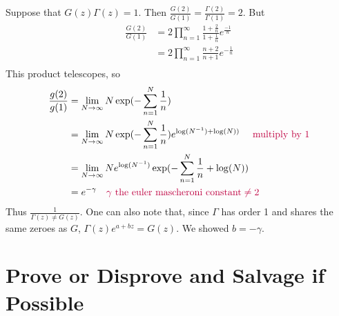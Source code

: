 \documentclass{homework}
\begin{document}
                                    \begin{solution}
                                    Suppose that $G(z)\Gamma(z) = 1$. Then $\frac{G(2)}{G(1)} = \frac{\Gamma(2)}{\Gamma(1)} = 2$. But
                                    \begin{align*}
                                    \frac{G(2)}{G(1)} &= 2\prod_{n=1}^\infty\frac{1+\frac{2}{n}}{1 + \frac{1}{n}}e^{\frac{-1}{n}}\\
                                    &= 2\prod_{n=1}^\infty \frac{n + 2}{n + 1}e^{-\frac{1}{n}}\\
                                    \end{align*}
                                    This product telescopes, so
                                    \begin{align*}
                                    \frac{g(2)}{g(1)} &= \lim_{N\to\infty} N\exp({-\sum_{n=1}^N \frac{1}{n}})\\
                                    &= \lim_{N\to\infty} N\exp({-\sum_{n=1}^N \frac{1}{n}})e^{\log(N^{-1}) + \log(N))}\quad\color{purple} \text{ multiply by 1}\\
                                    &= \lim_{N\to\infty} Ne^{\log(N^{-1})}\exp({-\sum_{n=1}^N \frac{1}{n} + \log(N)})\\
                                    &= e^{-\gamma} \quad\color{purple} \gamma \text{ the euler mascheroni constant} \neq 2
                                    \end{align*}
                                    Thus $\frac{1}{\Gamma(z)\neq G(z)}$. One can also note that, since $\Gamma$ has order 1 and shares the same zeroes as $G$, $\Gamma(z) e^{a+bz} = G(z)$. We showed $b=-\gamma$.
                                    \end{solution}

                                    \section{Prove or Disprove and Salvage if Possible}
\end{document}
